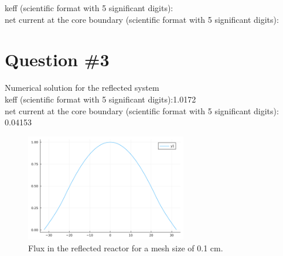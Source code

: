 \documentclass[11pt,a4paper]{article}
\begin{document}
keff (scientific format with 5 significant digits): \\
net current at the core boundary (scientific format with 5 significant digits): \\

\section{Question \#3}
Numerical solution for the reflected system \\
keff (scientific format with 5 significant digits):1.0172\\
net current at the core boundary (scientific format with 5 significant digits): 0.04153\\
\begin{figure}[h]
	\includegraphics[width=7cm]{../figs/ex2/reflector.png}
	\centering
	\caption{Flux in the reflected reactor for a mesh size of 0.1 cm.}
\end{figure}

\end{document}
